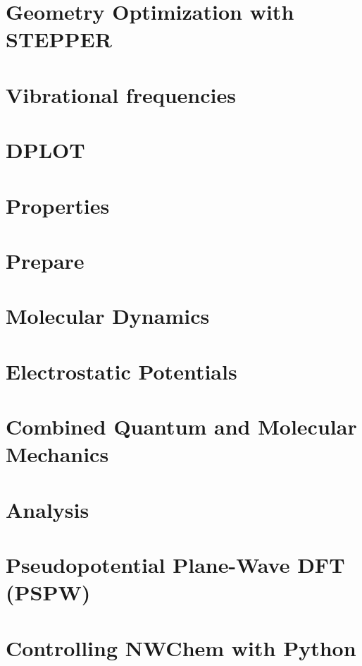 \chapter{Geometry Optimization with STEPPER}


\chapter{Vibrational frequencies}


\chapter{DPLOT}


\chapter{Properties}


\chapter{Prepare}


\chapter{Molecular Dynamics}


\chapter{Electrostatic Potentials}


\chapter{Combined Quantum and Molecular Mechanics}


\chapter{Analysis}



\chapter{Pseudopotential Plane-Wave DFT (PSPW)}


\chapter{Controlling NWChem with Python}


